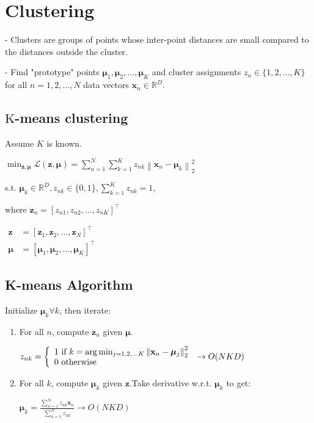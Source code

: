 
\section*{Clustering}
- Clusters are groups of points whose inter-point distances are small compared to the distances outside the cluster.

- Find "prototype" points $\boldsymbol{\mu}_{1}, \boldsymbol{\mu}_{2}, \ldots, \boldsymbol{\mu}_{K}$ and cluster assignments $z_{n} \in\{1,2, \ldots, K\}$ for all $n=1,2, \ldots, N$ data vectors $\mathbf{x}_{n} \in \mathbb{R}^{D}$.

\subsection*{$\mathrm{K}$-means clustering}
Assume $K$ is known.

$
\min _{\mathbf{z}, \boldsymbol{\mu}} \mathcal{L}(\mathbf{z}, \boldsymbol{\mu})=\sum_{n=1}^{N} \sum_{k=1}^{K} z_{n k}\left\|\mathbf{x}_{n}-\boldsymbol{\mu}_{k}\right\|_{2}^{2}
$

s.t. $\boldsymbol{\mu}_{k} \in \mathbb{R}^{D}, z_{n k} \in\{0,1\}, \sum_{k=1}^{K} z_{n k}=1$,

where $\mathbf{z}_{n}=\left[z_{n 1}, z_{n 2}, \ldots, z_{n K}\right]^{\top}$

$
\begin{aligned}
\mathbf{z} & =\left[\mathbf{z}_{1}, \mathbf{z}_{2}, \ldots, \mathbf{z}_{N}\right]^{\top} \\
\boldsymbol{\mu} & =\left[\boldsymbol{\mu}_{1}, \boldsymbol{\mu}_{2}, \ldots, \boldsymbol{\mu}_{K}\right]^{\top}
\end{aligned}
$

\subsection*{K-means Algorithm}

Initialize $\boldsymbol{\mu}_{k} \forall k$, then iterate:

\begin{enumerate}
  \item For all $n$, compute $\mathbf{z}_{n}$ given $\boldsymbol{\mu}$.
  
  $z_{n k}=\left\{\begin{array}{l}1 \text { if } k=\arg \min _{j=1,2, \ldots K}\left\|\mathbf{x}_{n}-\boldsymbol{\mu}_{j}\right\|_{2}^{2} \\ 0 \text { otherwise }\end{array}\right.\\\rightarrow O(NKD)$

  \item For all $k$, compute $\boldsymbol{\mu}_{k}$ given $\mathbf{z}$.Take derivative w.r.t. $\boldsymbol{\mu}_{k}$ to get:
  
  $
  \boldsymbol{\mu}_{k}=\frac{\sum_{n=1}^{N} z_{n k} \mathbf{x}_{n}}{\sum_{n=1}^{N} z_{n k}}
  \rightarrow O(NKD)$

\end{enumerate}



